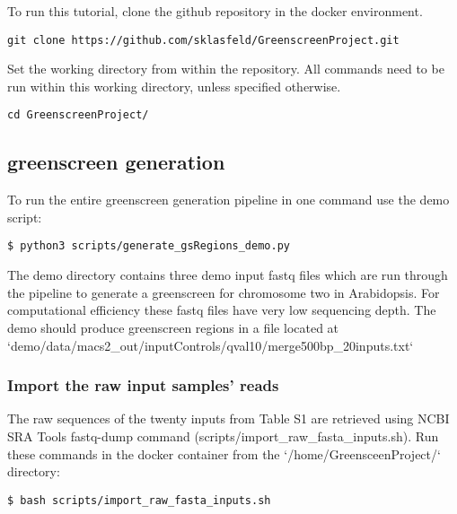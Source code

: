 \documentclass{article}
\begin{document}
\begin{sloppypar}
To run this tutorial, clone the github repository in the docker environment.

\begin{verbatim}
git clone https://github.com/sklasfeld/GreenscreenProject.git
\end{verbatim}

Set the working directory from within the repository. All commands need to be run within this working directory, unless specified otherwise.

\begin{verbatim}
cd GreenscreenProject/
\end{verbatim}

\subsection{greenscreen generation}

To run the entire greenscreen generation pipeline in one command use the demo script:

\begin{verbatim}
$ python3 scripts/generate_gsRegions_demo.py
\end{verbatim}

The demo directory contains three demo input fastq files which are run through the pipeline to generate a greenscreen for chromosome two in Arabidopsis. For computational efficiency these fastq files have very low sequencing depth. The demo should produce greenscreen regions in a file located at `demo/data/macs2\_out/inputControls/qval10/merge500bp\_20inputs.txt`

\subsubsection{Import the raw input samples' reads}

The raw sequences of the twenty inputs from Table S1 are retrieved using NCBI SRA Tools fastq-dump command ({\selectfont scripts/import\_raw\_fasta\_inputs.sh}). Run these commands in the docker container from the `/home/GreensceenProject/` directory:

\begin{verbatim}
$ bash scripts/import_raw_fasta_inputs.sh
\end{verbatim}


\end{sloppypar}
\end{document}
